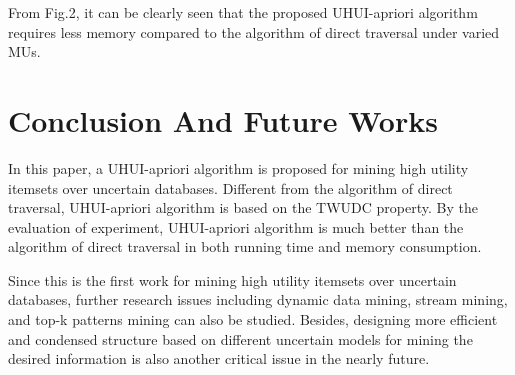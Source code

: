 \documentclass[conference]{IEEEtran}
\begin{document}
From Fig.2, it can be clearly seen that the proposed UHUI-apriori algorithm requires less memory compared to the algorithm of direct traversal under varied MUs.

\section{Conclusion And Future Works}
In this paper, a UHUI-apriori algorithm is proposed for mining high utility itemsets over uncertain databases. Different from the algorithm of direct traversal, UHUI-apriori algorithm is based on the TWUDC property. By the evaluation of experiment, UHUI-apriori algorithm is much better than the algorithm of direct traversal in both running time and memory consumption.

Since this is the first work for mining high utility itemsets over uncertain databases, further research issues including dynamic data mining, stream mining, and top-k patterns mining can also be studied. Besides, designing more efficient and condensed structure based on different uncertain models for mining the desired information is also another critical issue in the nearly future.














\end{document}

